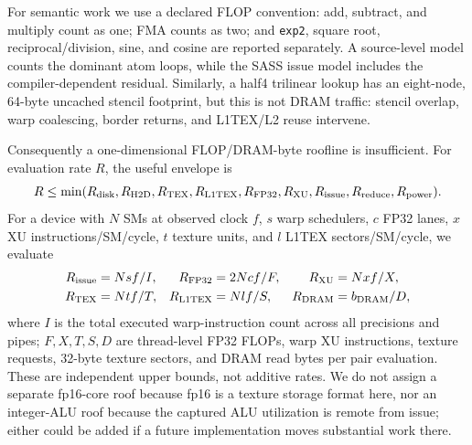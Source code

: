 For semantic work we use a declared FLOP convention: add, subtract, and
multiply count as one; FMA counts as two; and \texttt{exp2}, square root,
reciprocal/division, sine, and cosine are reported separately. A source-level
model counts the dominant atom loops, while the SASS issue model includes the
compiler-dependent residual. Similarly, a half4 trilinear lookup has an
eight-node, 64-byte uncached stencil footprint, but this is not DRAM traffic:
stencil overlap, warp coalescing, border returns, and L1TEX/L2 reuse intervene.

Consequently a one-dimensional FLOP/DRAM-byte roofline is insufficient. For
evaluation rate $R$, the useful envelope is
\begin{equation}
 R \leq \min(R_{\rm disk},R_{\rm H2D},R_{\rm TEX},R_{\rm L1TEX},
 R_{\rm FP32},R_{\rm XU},R_{\rm issue},R_{\rm reduce},R_{\rm power}).
\end{equation}
For a device with $N$ SMs at observed clock $f$, $s$ warp schedulers, $c$
FP32 lanes, $x$ XU instructions/SM/cycle, $t$ texture units, and $l$ L1TEX
sectors/SM/cycle, we evaluate
\begin{align}
R_{\rm issue}&=Nsf/I, & R_{\rm FP32}&=2Ncf/F, &
R_{\rm XU}&=Nxf/X,\\
R_{\rm TEX}&=Ntf/T, & R_{\rm L1TEX}&=Nlf/S, &
R_{\rm DRAM}&=b_{\rm DRAM}/D,
\end{align}
where $I$ is the total executed warp-instruction count across all precisions and
pipes; $F,X,T,S,D$ are thread-level FP32 FLOPs, warp XU instructions, texture
requests, 32-byte texture sectors, and DRAM read bytes per pair evaluation.
These are independent upper bounds, not additive rates. We do not assign a
separate fp16-core roof because fp16 is a texture storage format here, nor an
integer-ALU roof because the captured ALU utilization is remote from issue;
either could be added if a future implementation moves substantial work there.

